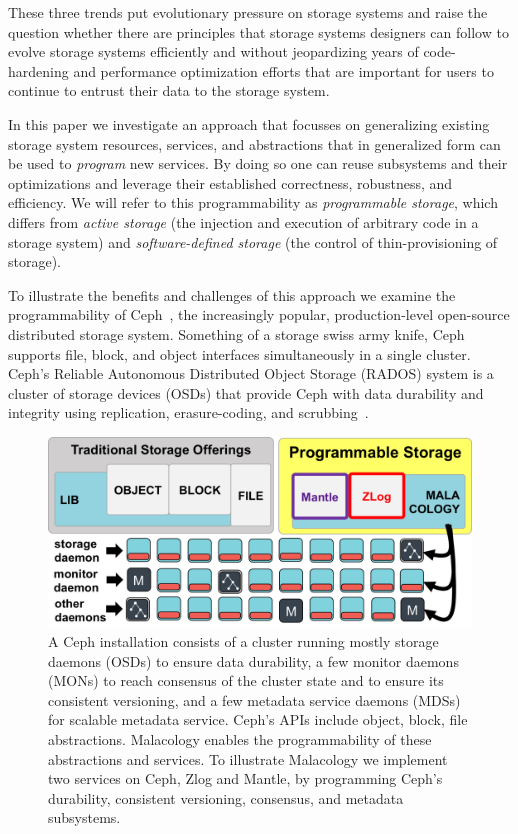 \documentclass[10pt,twocolumn]{article}
\begin{document}
These three trends put evolutionary pressure on storage systems and
raise the question whether there are principles that storage systems
designers can follow to evolve storage systems efficiently and without
jeopardizing years of code-hardening and performance optimization
efforts that are important for users to continue to entrust their data
to the storage system.

In this paper we investigate an approach that focusses on generalizing
existing storage system resources, services, and abstractions that in
generalized form can be used to \emph{program} new services. By doing so
one can reuse subsystems and their optimizations and leverage their
established correctness, robustness, and efficiency. We will refer to
this programmability as \emph{programmable storage}, which differs from
\emph{active storage} (the injection and execution of arbitrary code in
a storage system) and \emph{software-defined storage} (the control of
thin-provisioning of storage).

To illustrate the benefits and challenges of this approach we examine
the programmability of Ceph~\cite{weil_ceph_2006}, the increasingly
popular, production-level open-source distributed storage system.
Something of a storage swiss army knife, Ceph supports file, block, and
object interfaces simultaneously in a single cluster. Ceph's Reliable Autonomous Distributed Object Storage (RADOS) system is a cluster of storage
devices (OSDs) that provide Ceph with data durability and integrity
using replication, erasure-coding, and scrubbing~\cite{weil_rados_2007}. 

\begin{figure}[htbp]
\centering
\includegraphics{figures/overview.png}
\caption{A Ceph installation consists of a cluster running mostly
storage daemons (OSDs) to ensure data durability, a few monitor daemons
(MONs) to reach consensus of the cluster state and to ensure its
consistent versioning, and a few metadata service daemons (MDSs) for
scalable metadata service. Ceph's APIs include object, block, file
abstractions. Malacology enables the programmability of these
abstractions and services. To illustrate Malacology we implement two
services on Ceph, Zlog and Mantle, by programming Ceph's durability,
consistent versioning, consensus, and metadata subsystems.
\label{fig:overview}}
\end{figure}
\end{document}
